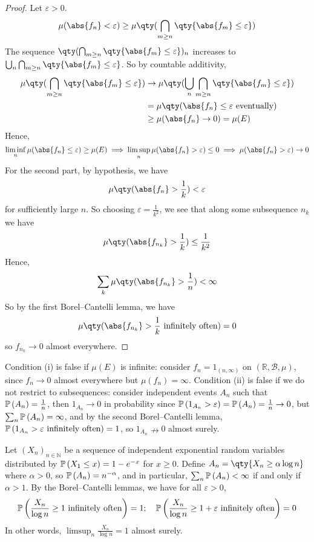 \begin{proof}
	Let $\varepsilon > 0$.
	\[ \mu(\abs{f_n} < \varepsilon) \geq \mu\qty(\bigcap_{m \geq n} \qty{\abs{f_m} \leq \varepsilon}) \]
	The sequence $\qty(\bigcap_{m \geq n} \qty{\abs{f_m} \leq \varepsilon})_n$ increases to $\bigcup_n \bigcap_{m \geq n} \qty{\abs{f_m} \leq \varepsilon}$.
	So by countable additivity,
	\begin{align*}
		\mu\qty(\bigcap_{m \geq n} \qty{\abs{f_m} \leq \varepsilon}) &\to \mu\qty(\bigcup_n \bigcap_{m \geq n} \qty{\abs{f_m} \leq \varepsilon}) \\
		&= \mu\qty(\abs{f_n} \leq \varepsilon \text{ eventually}) \\
		&\geq \mu(\abs{f_n} \to 0) = \mu(E)
	\end{align*}
	Hence,
	\[ \liminf_n \mu(\abs{f_n} \leq \varepsilon) \geq \mu(E) \implies \limsup_n \mu(\abs{f_n} > \varepsilon) \leq 0 \implies \mu(\abs{f_n} > \varepsilon) \to 0 \]
	For the second part, by hypothesis, we have
	\[ \mu\qty(\abs{f_n} > \frac{1}{k}) < \varepsilon \]
	for sufficiently large $n$.
	So choosing $\varepsilon = \frac{1}{k^2}$, we see that along some subsequence $n_k$ we have
	\[ \mu\qty(\abs{f_{n_k}} > \frac{1}{k}) \leq \frac{1}{k^2} \]
	Hence,
	\[ \sum_k \mu\qty(\abs{f_{n_k}} > \frac{1}{n}) < \infty \]
	So by the first Borel--Cantelli lemma, we have
	\[ \mu\qty(\abs{f_{n_k}} > \frac{1}{k} \text{ infinitely often}) = 0 \]
	so $f_{n_k} \to 0$ almost everywhere.
\end{proof}
\begin{remark}
	Condition (i) is false if $\mu(E)$ is infinite: consider $f_n = 1_{(n,\infty)}$ on $(\mathbb R,\mathcal B,\mu)$, since $f_n \to 0$ almost everywhere but $\mu(f_n) = \infty$.
	Condition (ii) is false if we do not restrict to subsequences: consider independent events $A_n$ such that $\mathbb{P}\left({A_n}\right) = \frac{1}{n}$, then $1_{A_n} \to 0$ in probability since $\mathbb{P}\left({1_{A_n} > \varepsilon}\right) = \mathbb{P}\left({A_n}\right) = \frac{1}{n} \to 0$, but $\sum_n \mathbb{P}\left({A_n}\right) = \infty$, and by the second Borel--Cantelli lemma, $\mathbb{P}\left({1_{A_n} > \varepsilon \text{ infinitely often}}\right) = 1$, so $1_{A_n} \nrightarrow 0$ almost surely.
\end{remark}
\begin{example}
	Let $(X_n)_{n \in \mathbb N}$ be a sequence of independent exponential random variables distributed by $\mathbb{P}\left({X_1 \leq x}\right) = 1 - e^{-x}$ for $x \geq 0$.
	Define $A_n = \qty{X_n \geq \alpha \log n}$ where $\alpha > 0$, so $\mathbb{P}\left({A_n}\right) = n^{-\alpha}$, and in particular, $\sum_n \mathbb{P}\left({A_n}\right) < \infty$ if and only if $\alpha > 1$.
	By the Borel--Cantelli lemmas, we have for all $\varepsilon > 0$,
	\[ \mathbb{P}\left({\frac{X_n}{\log n} \geq 1 \text{ infinitely often}}\right) = 1;\quad \mathbb{P}\left({\frac{X_n}{\log n} \geq 1 + \varepsilon \text{ infinitely often}}\right) = 0 \]
	In other words, $\limsup_n \frac{X_n}{\log n} = 1$ almost surely.
\end{example}

